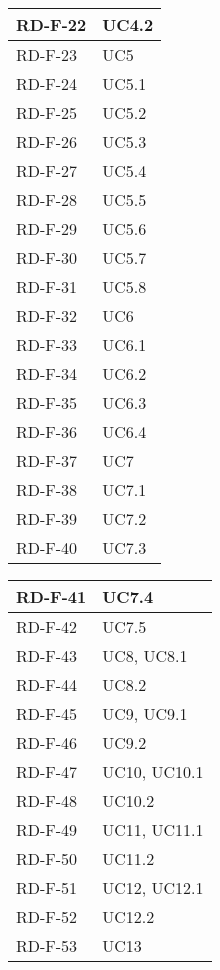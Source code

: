 \begin{center}
\begin{tabular}{ |m{8em}|m{13em}| }
    \hline
    RD-F-22  &  UC4.2 \\
    \hline
    RD-F-23  &  UC5 \\
    \hline
    RD-F-24  &  UC5.1 \\
    \hline
    RD-F-25  &  UC5.2 \\
    \hline
    RD-F-26  &  UC5.3 \\
    \hline
    RD-F-27  &  UC5.4 \\
    \hline
    RD-F-28  &  UC5.5 \\
    \hline
    RD-F-29  &  UC5.6 \\
    \hline
    RD-F-30  &  UC5.7 \\
    \hline
    RD-F-31  &  UC5.8 \\
    \hline
    RD-F-32  &  UC6 \\
    \hline
    RD-F-33  &  UC6.1 \\
    \hline
    RD-F-34  &  UC6.2 \\
    \hline
    RD-F-35  &  UC6.3 \\
    \hline
    RD-F-36  &  UC6.4 \\
    \hline
    RD-F-37  &  UC7 \\
    \hline
    RD-F-38  &  UC7.1 \\
    \hline
    RD-F-39  &  UC7.2 \\
    \hline
    RD-F-40  &  UC7.3 \\
    \hline
    \end{tabular}
    \newpage
    \begin{tabular}{ |m{8em}|m{13em}| }
    \hline
    RD-F-41  &  UC7.4 \\
    \hline
    RD-F-42  &  UC7.5 \\
    \hline
    RD-F-43  &  UC8, UC8.1 \\
    \hline
    RD-F-44  &  UC8.2 \\
    \hline
    RD-F-45  &  UC9, UC9.1 \\
    \hline
    RD-F-46  &  UC9.2 \\
    \hline
    RD-F-47  &  UC10, UC10.1 \\
    \hline
    RD-F-48  &  UC10.2 \\
    \hline
    RD-F-49  &  UC11, UC11.1 \\
    \hline
    RD-F-50  &  UC11.2 \\
    \hline
    RD-F-51  &  UC12, UC12.1 \\
    \hline
    RD-F-52  &  UC12.2 \\
    \hline
    RD-F-53  &  UC13 \\

\end{tabular}
\end{center}
